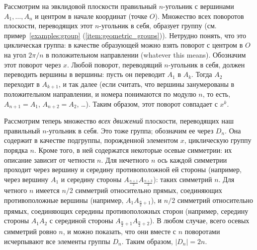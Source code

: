 \nopagebreak

Рассмотрим на эвклидовой плоскости правильный $n$-угольник с вершинами
$A_1,\dots,A_n$ и центром в начале координат (точке $O$).
Множество всех поворотов плоскости, переводящих этот $n$-угольник в
себя, образует группу (см. пример~\ref{examples:group}
(\ref{item:geometric_groups})).
Нетрудно понять, что это циклическая группа: в качестве образующей
можно взять поворот с центром в $O$ на угол $2\pi/n$ в положительном
направлении (whatever this means). Обозначим этот поворот через $x$.
Любой поворот, переводящий $n$-угольник в себя, должен переводить
вершины в вершины: пусть он переводит $A_1$ в $A_k$.
Тогда $A_2$ переходит в $A_{k+1}$, и так далее (если считать, что
вершины занумерованы в положительном направлении, и номера понимаются
по модулю $n$, то есть, $A_{n+1} = A_1$, $A_{n+2} = A_2$,
\dots). Таким образом, этот поворот совпадает с $x^k$.

Рассмотрим теперь множество {\it всех движений} плоскости, переводящих
наш правильный $n$-угольник в себя. Это тоже группа; обозначим ее
через $D_n$.
Она содержит в качестве подгруппы, порожденной элементом $x$,
циклическую группу порядка $n$.
Кроме того, в ней содержатся некоторые осевые симметрии: их описание
зависит от четности $n$. Для нечетного $n$ ось каждой симметрии
проходит через вершину и середину противоположной ей стороны
(например, через вершину $A_1$ и середину стороны
$A_{\frac{n+1}{2}}A_{\frac{n+3}{2}}$): таких симметрий $n$.
Для четного $n$ имеется $n/2$ симметрий относительно прямых,
соединяющих противоположные вершины (например,
$A_1A_{\frac{n}{2}+1}$), и $n/2$ симметрий относительно прямых,
соединяющих середины противоположных сторон (например, середину
стороны $A_1A_2$ с серединой стороны
$A_{\frac{n}{2}+1}A_{\frac{n}{2}+2}$).
В любом случае, всего осевых симметрий ровно $n$, и можно показать,
что они вместе с $n$ поворотами исчерпывают все элементы группы
$D_n$. Таким образом, $|D_n| = 2n$.

